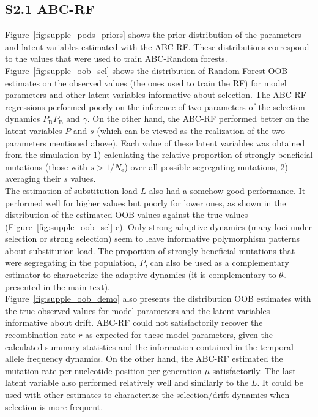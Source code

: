 \documentclass[a4paper, 12pt]{article}
\begin{document}
\subsection*{S2.1 ABC-RF}

Figure~\ref{fig:supple_pods_priors} shows the prior distribution of the parameters and latent variables estimated with the ABC-RF. These distributions correspond to the values that were used to train ABC-Random forests.\\

Figure~\ref{fig:supple_oob_sel} shows the distribution of Random Forest OOB estimates on the observed values (the ones used to train the RF) for model parameters and other latent variables informative about selection. The ABC-RF regressions performed poorly on the inference of two parameters of the selection dynamics $P_{\mathrm{R}}P_{\mathrm{B}}$ and $\gamma$. On the other hand, the ABC-RF performed better on the latent variables $P$ and $\bar{s}$ (which can be viewed as the realization of the two parameters mentioned above). Each value of these latent variables was obtained from the simulation by 1) calculating the relative proportion of strongly beneficial mutations (those with $s > 1/N_{\mathrm{e}}$) over all possible segregating mutations, 2) averaging their $s$ values.\\

The estimation of substitution load $L$ also had a somehow good performance. It performed well for higher values but poorly for lower ones, as shown in the distribution of the estimated OOB values against the true values (Figure~\ref{fig:supple_oob_sel} e). Only strong adaptive dynamics (many loci under selection or strong selection) seem to leave informative polymorphism patterns about substitution load. The proportion of strongly beneficial mutations that were segregating in the population, $P$, can also be used as a complementary estimator to characterize the adaptive dynamics (it is complementary to $\theta_{\mathrm{b}}$ presented in the main text).\\

Figure~\ref{fig:supple_oob_demo} also presents the distribution OOB estimates with the true observed values for model parameters and the latent variables informative about drift. ABC-RF could not satisfactorily recover the recombination rate $r$ as expected for these model parameters, given the calculated summary statistics and the information contained in the temporal allele frequency dynamics. On the other hand, the ABC-RF estimated the mutation rate per nucleotide position per generation $\mu$ satisfactorily. The last latent variable also performed relatively well and similarly to the $L$. It could be used with other estimates to characterize the selection/drift dynamics when selection is more frequent.\\
\end{document}
